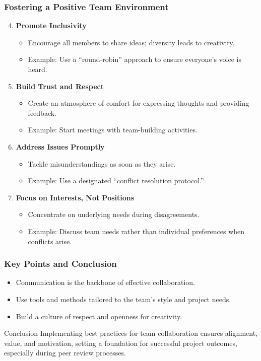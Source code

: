 \documentclass[aspectratio=169]{beamer}
\begin{document}
\begin{frame}[fragile]
    \frametitle{Fostering a Positive Team Environment}
    \begin{enumerate}
        \setcounter{enumi}{3}
        \item \textbf{Promote Inclusivity}
        \begin{itemize}
            \item Encourage all members to share ideas; diversity leads to creativity.
            \item Example: Use a “round-robin” approach to ensure everyone’s voice is heard.
        \end{itemize}
        
        \item \textbf{Build Trust and Respect}
        \begin{itemize}
            \item Create an atmosphere of comfort for expressing thoughts and providing feedback.
            \item Example: Start meetings with team-building activities.
        \end{itemize}
        
        \item \textbf{Address Issues Promptly}
        \begin{itemize}
            \item Tackle misunderstandings as soon as they arise.
            \item Example: Use a designated “conflict resolution protocol.”
        \end{itemize}
        
        \item \textbf{Focus on Interests, Not Positions}
        \begin{itemize}
            \item Concentrate on underlying needs during disagreements.
            \item Example: Discuss team needs rather than individual preferences when conflicts arise.
        \end{itemize}
    \end{enumerate}
\end{frame}

\begin{frame}[fragile]
    \frametitle{Key Points and Conclusion}
    \begin{itemize}
        \item Communication is the backbone of effective collaboration.
        \item Use tools and methods tailored to the team’s style and project needs.
        \item Build a culture of respect and openness for creativity.
    \end{itemize}

    \begin{block}{Conclusion}
        Implementing best practices for team collaboration ensures alignment, value, and motivation, setting a foundation for successful project outcomes, especially during peer review processes. 
    \end{block}
\end{frame}
\end{document}
